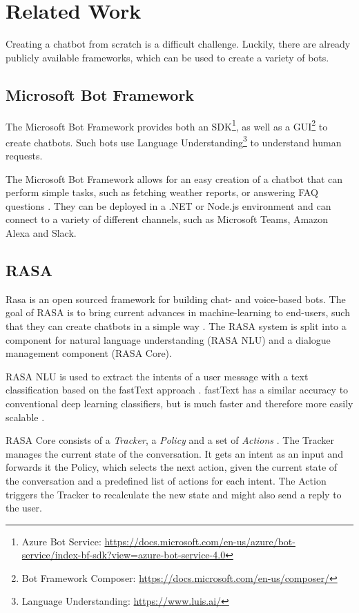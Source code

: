 \section{Related Work} \label{lab:relWork}

Creating a chatbot from scratch is a difficult challenge. Luckily, there are already publicly available frameworks, which can be used to create a variety of bots.

\subsection{Microsoft Bot Framework}
The Microsoft Bot Framework provides both an SDK\footnote{Azure Bot Service: \href{https://docs.microsoft.com/en-us/azure/bot-service/index-bf-sdk?view=azure-bot-service-4.0}{https://docs.microsoft.com/en-us/azure/bot-service/index-bf-sdk?view=azure-bot-service-4.0}}, as well as a GUI\footnote{Bot Framework Composer: \href{https://docs.microsoft.com/en-us/composer/}{https://docs.microsoft.com/en-us/composer/}} to create chatbots. Such bots use Language Understanding\footnote{Language Understanding: \href{https://www.luis.ai/}{https://www.luis.ai/}} to understand human requests.

The Microsoft Bot Framework allows for an easy creation of a chatbot that can perform simple tasks, such as fetching weather reports, or answering FAQ questions \cite{CaWh14}. They can be deployed in a .NET or Node.js environment and can connect to a variety of different channels, such as Microsoft Teams, Amazon Alexa and Slack.

\subsection{RASA}
Rasa is an open sourced framework for building chat- and voice-based bots. The goal of RASA is to bring current advances in machine-learning to end-users, such that they can create chatbots in a simple way \cite{BFPN17}. The RASA system is split into a component for natural language understanding (RASA NLU) and a dialogue management component (RASA Core).

RASA NLU is used to extract the intents of a user message with a text classification based on the fastText approach \cite{BFPN17}. fastText has a similar accuracy to conventional deep learning classifiers, but is much faster and therefore more easily scalable \cite{JGBM16}.

RASA Core consists of a \emph{Tracker}, a \emph{Policy} and a set of \emph{Actions} \cite{BFPN17}. The Tracker manages the current state of the conversation. It gets an intent as an input and forwards it the Policy, which selects the next action, given the current state of the conversation and a predefined list of actions for each intent. The Action triggers the Tracker to recalculate the new state and might also send a reply to the user.

